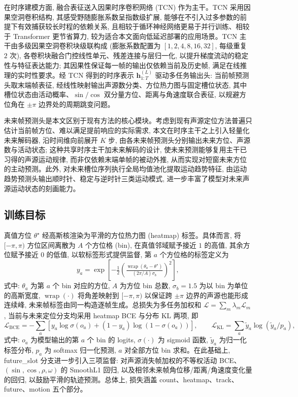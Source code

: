 \documentclass[lang=cn,a4paper,newtx]{elegantpaper}
\newcommand{\wrap}{\operatorname{wrap}}
\begin{document}
在时序建模方面, 融合表征送入因果时序卷积网络 (TCN) 作为主干。TCN 采用因果空洞卷积结构, 其感受野随膨胀系数呈指数级扩展, 能够在不引入过多参数的前提下有效捕获较长时程的依赖关系, 且相较于循环神经网络更易于并行训练、相较于 Transformer 更节省算力, 较为适合本文面向低延迟部署的应用场景。TCN 主干由多级因果空洞卷积块级联构成 (膨胀系数配置为 $[1,2,4,8,16,32]$, 每级重复 $2$ 次), 各卷积块融合门控线性单元、残差连接与层归一化, 以提升梯度流动的稳定性与特征表达能力; 其因果性保证每一帧的输出仅依赖当前及历史帧, 满足在线推理的实时性要求。经 TCN 得到的时序表示 $\mathbf{h}^{(L)}_{1:T}$ 驱动多任务输出头: 当前帧预测头取末端帧表征, 经线性映射输出声源数分类、方位热力图与固定槽位状态, 其中槽位状态由活动概率、$\sin/\cos$ 双分量方位、距离与角速度联合表征, 以规避方位角在 $\pm\pi$ 边界处的周期跳变问题。

未来帧预测头是本文区别于现有方法的核心模块。考虑到现有声源定位方法普遍只估计当前帧方位、难以满足提前响应的实际需求, 本文在时序主干之上引入轻量化未来解码器, 沿时间维向前展开 $K$ 步, 由各未来帧预测头分别输出未来方位、声源数与活动状态; 这种共享时序主干加未来解码的设计, 使未来预测能够复用主干已习得的声源运动规律, 而非仅依赖末端单帧的被动外推, 从而实现对短窗未来方位的主动预测。此外, 对未来槽位序列执行全局均值池化提取运动趋势特征, 由运动趋势预测头输出顺时针、稳定与逆时针三类运动模式, 进一步丰富了模型对未来声源运动状态的刻画能力。

\subsection{训练目标}

真值方位 $\theta^\star$ 经高斯核渲染为平滑的方位热力图 (heatmap) 标签。具体而言, 将 $[-\pi,\pi)$ 方位区间离散为 $A$ 个方位格 (bin), 在真值邻域赋予接近 $1$ 的高值, 其余方位赋予接近 $0$ 的低值, 以软标签形式提供监督, 第 $a$ 个方位格的标签定义为
\begin{equation}
  y_a=\exp\!\left[-\tfrac{1}{2}\!\left(\tfrac{\wrap(\theta_a-\theta^\star)}{(2\pi/A)\sigma_b}\right)^{\!2}\right],
  \label{eq:label}
\end{equation}
式中: $\theta_a$ 为第 $a$ 个 bin 对应的方位, $A$ 为方位 bin 总数, $\sigma_b{=}1.5$ 为以 bin 为单位的高斯宽度, $\wrap(\cdot)$ 将角差映射到 $[-\pi,\pi)$ 以保证跨 $\pm\pi$ 边界的声源也能形成连续峰, 未来帧标签由同一构造逐帧生成。总损失为多任务加权和 $\mathcal{L}=\sum_m \lambda_m\mathcal{L}_m$, 当前与未来定位分支均采用 heatmap BCE 与分布 KL 两项, 即
\begin{equation}
  \mathcal{L}_\mathrm{BCE}=-\textstyle\sum_a[y_a\log\sigma(o_a)+(1-y_a)\log(1-\sigma(o_a))],\qquad
  \mathcal{L}_\mathrm{KL}=\textstyle\sum_a \tilde{y}_a\log(\tilde{y}_a/p_a),
  \label{eq:loss}
\end{equation}
式中: $o_a$ 为模型输出的第 $a$ 个 bin 的 logits, $\sigma(\cdot)$ 为 sigmoid 函数, $\tilde{y}_a$ 为归一化标签分布, $p_a$ 为 softmax 归一化预测, $a$ 对全部方位 bin 求和。在此基础上, future\_slot 分支进一步引入三项监督: 对声源消失帧加权的不等权活动 BCE、$(\sin,\cos,\rho,\omega)$ 的 SmoothL1 回归, 以及相邻未来帧角位移/距离/角速度变化量的回归, 以鼓励平滑的轨迹预测。总体上, 损失涵盖 count、heatmap、track、future、motion 五个部分。
\end{document}
